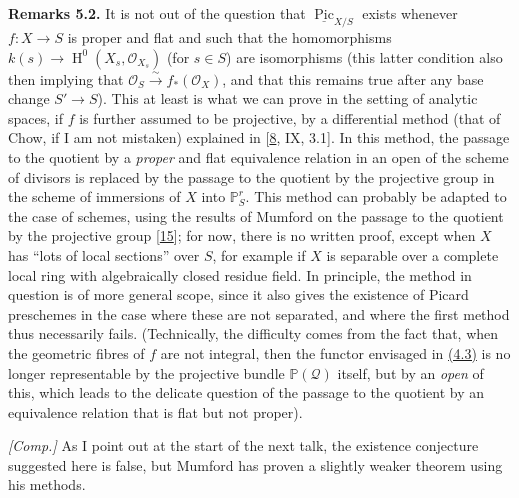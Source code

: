 \documentclass{article}
\newenvironment{rmenv}[1]
  {\phantomsection\par\smallskip\noindent\textbf{#1.}\rmfamily}
  {\par\smallskip}
\newcommand{\oldpage}[1]{\marginpar{\footnotesize$\Big\vert$ \textit{p.~#1}}}
\theoremstyle{definition}
\theoremstyle{definition}
\theoremstyle{definition}
\theoremstyle{definition}
\theoremstyle{remark}
\begin{document}
\leavevmode{}%
\begin{rmenv}{Remarks 5.2}
It is not out of the question that \(\underline{\operatorname{Pic}}_{X/S}\) exists whenever \(f\colon X\to S\) is proper and flat and such that the homomorphisms \(k(s)\to\operatorname{H}^0(X_s,{\mathscr{O}}_{X_s})\) (for \(s\in S\)) are isomorphisms (this latter condition also then implying that \({\mathscr{O}}_S\xrightarrow{\sim}f_*({\mathscr{O}}_X)\), and that this remains true after any base change \(S'\to S\)).
This at least is what we can prove in the setting of analytic spaces, if \(f\) is further assumed to be projective, by a differential method (that of Chow, if I am not mistaken) explained in {[}\protect\hyperlink{ref-Gro1960a}{8}, IX, 3.1{]}.
\oldpage{232-14}In this method, the passage to the quotient by a \emph{proper} and flat equivalence relation in an open of the scheme of divisors is replaced by the passage to the quotient by the projective group in the scheme of immersions of \(X\) into \(\mathbb{P}_S^r\).
This method can probably be adapted to the case of schemes, using the results of Mumford on the passage to the quotient by the projective group {[}\protect\hyperlink{ref-Mum1961}{15}{]};
for now, there is no written proof, except when \(X\) has ``lots of local sections'' over \(S\), for example if \(X\) is separable over a complete local ring with algebraically closed residue field.
In principle, the method in question is of more general scope, since it also gives the existence of Picard preschemes in the case where these are not separated, and where the first method thus necessarily fails.
(Technically, the difficulty comes from the fact that, when the geometric fibres of \(f\) are not integral, then the functor envisaged in \protect\hyperlink{fga-3-v-theorem-4.3}{(4.3)} is no longer representable by the projective bundle \(\mathbb{P}({\mathscr{Q}})\) itself, but by an \emph{open} of this, which leads to the delicate question of the passage to the quotient by an equivalence relation that is flat but not proper).

\emph{{[}Comp.{]}}
As I point out at the start of the next talk, the existence conjecture suggested here is false, but Mumford has proven a slightly weaker theorem using his methods.

\end{rmenv}
\end{document}
